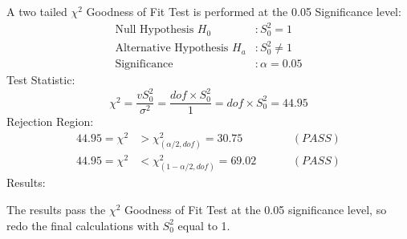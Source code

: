 A two tailed $\chi^2$ Goodness of Fit Test is performed at the 0.05 Significance level:
\begin{align*}
\text{Null Hypothesis } H_0 &: S_0^2 = 1 \\
\text{Alternative Hypothesis } H_a &: S_0^2 \neq 1 \\
\text{Significance } &: \alpha = 0.05 
\end{align*}
Test Statistic:
\[
\chi^2 = \dfrac{vS_0^2}{\sigma^2} = \dfrac{dof\times S_0^2}{1} = dof\times S_0^2 = 44.95
\]
Rejection Region:
\begin{align*}
44.95 = \chi^2 &> \chi_{(\alpha/2,dof)}^2 = 30.75 \hspace{1cm} &(PASS)\\
44.95 = \chi^2 &< \chi_{(1-\alpha/2,dof)}^2 = 69.02 \hspace{1cm} &(PASS)
\end{align*}
Results:

The results pass the $\chi^2$ Goodness of Fit Test at the 0.05 significance level, so redo the final calculations with $S_0^2$ equal to 1.
